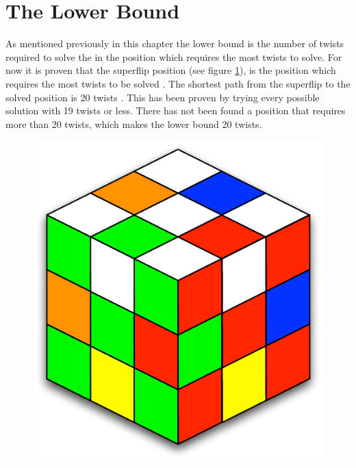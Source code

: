 \section{The Lower Bound}
As mentioned previously in this chapter the lower bound is the number of twists required to solve the \rubik{} in the position which requires the most twists to solve. 
For now it is proven that the superflip position (see figure \ref{fig:superflip}), is the position which requires the most twists to be solved \cite{speedsolving.wiki}.
The shortest path from the superflip to the solved position is 20 twists \cite{rokicki09}.
This has been proven by trying every possible solution with 19 twists or less. 
There has not been found a position that requires more than 20 twists, which makes the lower bound 20 twists.


\begin{figure}[htbp]
	\centering
		\includegraphics[scale = 0.7]{input/pics/superflip.pdf}
	\caption{}
	\label{fig:superflip}
\end{figure}


